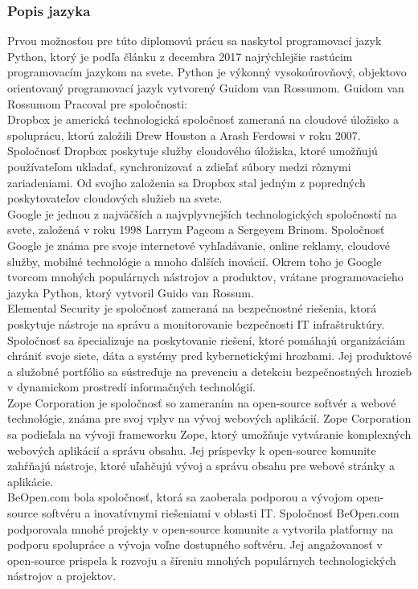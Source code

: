 \subsubsection{Popis jazyka}
\tab[5 mm] Prvou možnosťou pre túto diplomovú prácu sa naskytol programovací jazyk Python, ktorý je podľa článku z decembra 2017 \cite{srinath2017python} najrýchlejšie rastúcim programovacím jazykom na svete. Python je výkonný vysokoúrovňový, objektovo orientovaný programovací jazyk vytvorený Guidom van Rossumom. Guidom van Rossumom Pracoval pre spoločnosti:\\
\tab[5 mm] Dropbox je americká technologická spoločnosť zameraná na cloudové úložisko a spoluprácu, ktorú založili Drew Houston a Arash Ferdowsi v roku 2007. Spoločnosť Dropbox poskytuje služby cloudového úložiska, ktoré umožňujú používateľom ukladať, synchronizovať a zdieľať súbory medzi rôznymi zariadeniami. Od svojho založenia sa Dropbox stal jedným z popredných poskytovateľov cloudových služieb na svete. \\
\tab[5 mm] Google je jednou z najväčších a najvplyvnejších technologických spoločností na svete, založená v roku 1998 Larrym Pageom a Sergeyem Brinom. Spoločnosť Google je známa pre svoje internetové vyhľadávanie, online reklamy, cloudové služby, mobilné technológie a mnoho ďalších inovácií. Okrem toho je Google tvorcom mnohých populárnych nástrojov a produktov, vrátane programovacieho jazyka Python, ktorý vytvoril Guido van Rossum.\\
\tab[5 mm] Elemental Security je spoločnosť zameraná na bezpečnostné riešenia, ktorá poskytuje nástroje na správu a monitorovanie bezpečnosti IT infraštruktúry. Spoločnosť sa špecializuje na poskytovanie riešení, ktoré pomáhajú organizáciám chrániť svoje siete, dáta a systémy pred kybernetickými hrozbami. Jej produktové a služobné portfólio sa sústreďuje na prevenciu a detekciu bezpečnostných hrozieb v dynamickom prostredí informačných technológií. \\
\tab[5 mm] Zope Corporation je spoločnosť so zameraním na open-source softvér a webové technológie, známa pre svoj vplyv na vývoj webových aplikácií. Zope Corporation sa podieľala na vývoji frameworku Zope, ktorý umožňuje vytváranie komplexných webových aplikácií a správu obsahu. Jej príspevky k open-source komunite zahŕňajú nástroje, ktoré uľahčujú vývoj a správu obsahu pre webové stránky a aplikácie. \\
\tab[5 mm] BeOpen.com bola spoločnosť, ktorá sa zaoberala podporou a vývojom open-source softvéru a inovatívnymi riešeniami v oblasti IT. Spoločnosť BeOpen.com podporovala mnohé projekty v open-source komunite a vytvorila platformy na podporu spolupráce a vývoja voľne dostupného softvéru. Jej angažovanosť v open-source prispela k rozvoju a šíreniu mnohých populárnych technologických nástrojov a projektov. \\

